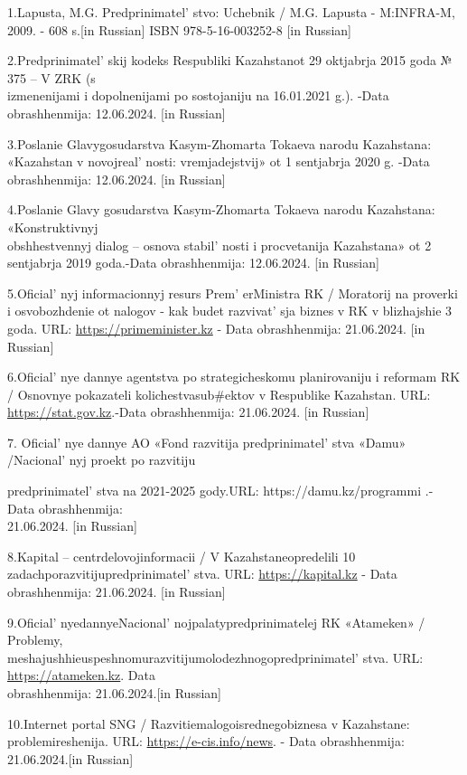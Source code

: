 \begin{references}
1.Lapusta, M.G. Predprinimatel' stvo: Uchebnik / M.G.
Lapusta - M:INFRA-M, 2009. - 608 s.{[}in Russian{]} ISBN
978-5-16-003252-8 {[}in Russian{]}

2.Predprinimatel' skij kodeks Respubliki Kazahstanot 29
oktjabrja 2015 goda № 375 -- V ZRK (s \\izmenenijami i dopolnenijami po
sostojaniju na 16.01.2021 g.). -Data obrashhenmija: 12.06.2024. {[}in
Russian{]}

3.Poslanie Glavygosudarstva Kasym-Zhomarta Tokaeva narodu Kazahstana:
«Kazahstan v novojreal' nosti: vremjadejstvij» ot 1
sentjabrja 2020 g. -Data obrashhenmija: 12.06.2024. {[}in Russian{]}

4.Poslanie Glavy gosudarstva Kasym-Zhomarta Tokaeva narodu Kazahstana:
«Konstruktivnyj \\obshhestvennyj dialog -- osnova
stabil' nosti i procvetanija Kazahstana» ot 2 sentjabrja
2019 goda.-Data obrashhenmija: 12.06.2024. {[}in Russian{]}

5.Oficial' nyj informacionnyj resurs
Prem' erMinistra RK / Moratorij na proverki i
osvobozhdenie ot nalogov - kak budet razvivat' sja biznes
v RK v blizhajshie 3 goda. URL: \href{https://primeminister.kz/}{https://primeminister.kz} - Data
obrashhenmija: 21.06.2024. {[}in Russian{]}

6.Oficial' nye dannye agentstva po strategicheskomu
planirovaniju i reformam RK / Osnovnye pokazateli kolichestvasub\#ektov
v Respublike Kazahstan. URL: \href{https://stat.gov.kz/}{https://stat.gov.kz}.-Data
obrashhenmija: 21.06.2024. {[}in Russian{]}

7. Oficial' nye dannye AO «Fond razvitija
predprinimatel' stva «Damu» /Nacional' nyj
proekt po razvitiju

predprinimatel' stva na 2021-2025
gody.URL: https://damu.kz/programmi .- Data obrashhenmija: \\21.06.2024.
{[}in Russian{]}

8.Kapital -- centrdelovojinformacii / V Kazahstaneopredelili 10
zadachporazvitijupredprinimatel' stva. URL:
\href{https://kapital.kz}{https://kapital.kz} - Data obrashhenmija: 21.06.2024. {[}in
Russian{]}

9.Oficial' nyedannyeNacional' nojpalatypredprinimatelej
RK «Atameken» / Problemy,\\
meshajushhieuspeshnomurazvitijumolodezhnogopredprinimatel' stva.
URL: \href{https://atameken.kz}{https://atameken.kz}. Data \\obrashhenmija: 21.06.2024.{[}in
Russian{]}

10.Internet portal SNG / Razvitiemalogoisrednegobiznesa v Kazahstane:
problemireshenija. URL: \href{https://e-cis.info/news}{https://e-cis.info/news}. - Data
obrashhenmija: 21.06.2024.{[}in Russian{]}
\end{references}

